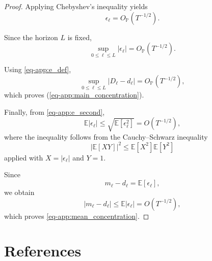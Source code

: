 \documentclass[10pt]{iopart}
\newcommand{\1}{\mathbf{1}}
\begin{document}
\begin{proof}
Applying Chebyshev's inequality yields
\begin{equation}
\epsilon_\ell
=
O_{\mathbb P}(T^{-1/2}).
\label{eq-app:e_prob}
\end{equation}

Since the horizon $L$ is fixed,
\begin{equation}
\sup_{0\le \ell\le L}|\epsilon_\ell|
=
O_{\mathbb P}(T^{-1/2}).
\label{eq-app:e_sup}
\end{equation}

Using \ref{eq-app:e_def},
\begin{equation}
\sup_{0\le \ell\le L}|D_\ell-d_\ell|
=
O_{\mathbb P}(T^{-1/2}),
\label{eq-app:final_main}
\end{equation}
which proves (\ref{eq-app:main_concentration}).

Finally, from \ref{eq-app:e_second},
\begin{equation}
\mathbb E|\epsilon_\ell|
\le
\sqrt{\mathbb E[\epsilon_\ell^2]}
=
O(T^{-1/2}),
\label{eq-app:e_first}
\end{equation}
where the inequality follows from the Cauchy--Schwarz inequality
\[
|\mathbb E[XY]|^2
\le
\mathbb E[X^2]\mathbb E[Y^2]
\]
applied with $X=|\epsilon_\ell|$ and $Y=1$.

Since
\begin{equation}
m_\ell-d_\ell
=
\mathbb E[\epsilon_\ell],
\label{eq-app:m_minus_d}
\end{equation}
we obtain
\begin{equation}
|m_\ell-d_\ell|
\le
\mathbb E|\epsilon_\ell|
=
O(T^{-1/2}),
\label{eq-app:final_mean}
\end{equation}
which proves \ref{eq-app:mean_concentration}.

\end{proof}


\section*{References}

% 

%
\end{document}
